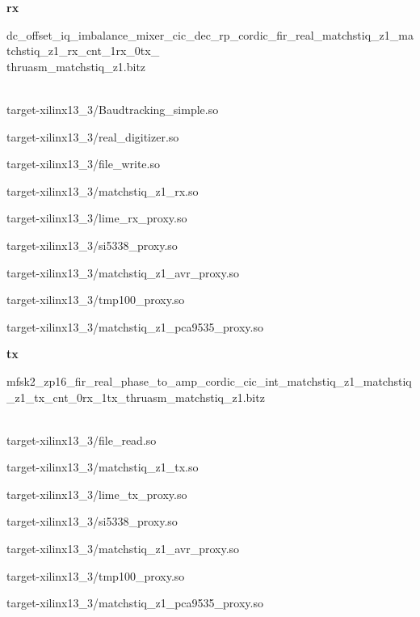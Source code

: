 \begin{appendices}
	\noindent\textbf{rx}
	\begin{itemize}
	\item dc\_offset\_iq\_imbalance\_mixer\_cic\_dec\_rp\_cordic\_fir\_real\_matchstiq\_z1\_matchstiq\_z1\_rx\_cnt\_1rx\_0tx\_ \\ thruasm\_matchstiq\_z1.bitz \\ \\
	\begin{minipage}[t]{.5\textwidth}\item target-xilinx13\_3/Baudtracking\_simple.so
	\item target-xilinx13\_3/real\_digitizer.so
	\item target-xilinx13\_3/file\_write.so
	\item target-xilinx13\_3/matchstiq\_z1\_rx.so
	\item target-xilinx13\_3/lime\_rx\_proxy.so
	\end{minipage}
	\begin{minipage}[t]{.5\textwidth}	\item target-xilinx13\_3/si5338\_proxy.so
	\item target-xilinx13\_3/matchstiq\_z1\_avr\_proxy.so
	\item target-xilinx13\_3/tmp100\_proxy.so
	\item target-xilinx13\_3/matchstiq\_z1\_pca9535\_proxy.so
	\end{minipage}
	\end{itemize}

	\noindent\textbf{tx}
	\begin{itemize}
	\item
mfsk2\_zp16\_fir\_real\_phase\_to\_amp\_cordic\_cic\_int\_matchstiq\_z1\_matchstiq\_z1\_tx\_cnt\_0rx\_1tx\_thruasm\_matchstiq\_z1.bitz	\\ \\
	\begin{minipage}[t]{.5\textwidth}
	\item target-xilinx13\_3/file\_read.so
	\item target-xilinx13\_3/matchstiq\_z1\_tx.so
	\item target-xilinx13\_3/lime\_tx\_proxy.so
	\item target-xilinx13\_3/si5338\_proxy.so
	\end{minipage}
	\begin{minipage}[t]{.5\textwidth}
	\item target-xilinx13\_3/matchstiq\_z1\_avr\_proxy.so
	\item target-xilinx13\_3/tmp100\_proxy.so
	\item target-xilinx13\_3/matchstiq\_z1\_pca9535\_proxy.so
	\end{minipage}
	\end{itemize}


\end{appendices}
